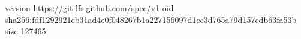 version https://git-lfs.github.com/spec/v1
oid sha256:fdf1292921eb31ad4e0f048267b1a227156097d1ec3d765a79d157cdb63fa53b
size 127465

